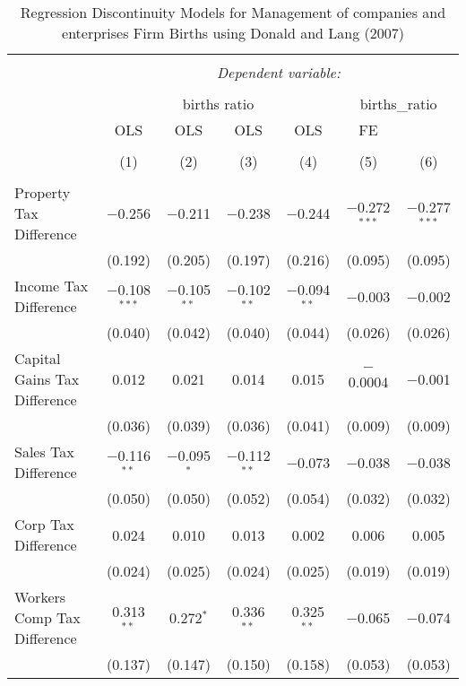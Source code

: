 
\begin{table}[!htbp] \centering 
  \caption{Regression Discontinuity Models for  Management of companies and enterprises Firm Births using Donald and Lang (2007)} 
  \label{} 
\begin{tabular}{@{\extracolsep{5pt}}lcccccc} 
\\[-1.8ex]\hline 
\hline \\[-1.8ex] 
 & \multicolumn{6}{c}{\textit{Dependent variable:}} \\ 
\cline{2-7} 
\\[-1.8ex] & \multicolumn{4}{c}{births ratio} & \multicolumn{2}{c}{births\_ratio} \\ 
 & OLS & OLS & OLS & OLS & FE &  \\ 
\\[-1.8ex] & (1) & (2) & (3) & (4) & (5) & (6)\\ 
\hline \\[-1.8ex] 
 Property Tax Difference & $-$0.256 & $-$0.211 & $-$0.238 & $-$0.244 & $-$0.272$^{***}$ & $-$0.277$^{***}$ \\ 
  & (0.192) & (0.205) & (0.197) & (0.216) & (0.095) & (0.095) \\ 
  Income Tax Difference & $-$0.108$^{***}$ & $-$0.105$^{**}$ & $-$0.102$^{**}$ & $-$0.094$^{**}$ & $-$0.003 & $-$0.002 \\ 
  & (0.040) & (0.042) & (0.040) & (0.044) & (0.026) & (0.026) \\ 
  Capital Gains Tax Difference & 0.012 & 0.021 & 0.014 & 0.015 & $-$0.0004 & $-$0.001 \\ 
  & (0.036) & (0.039) & (0.036) & (0.041) & (0.009) & (0.009) \\ 
  Sales Tax Difference & $-$0.116$^{**}$ & $-$0.095$^{*}$ & $-$0.112$^{**}$ & $-$0.073 & $-$0.038 & $-$0.038 \\ 
  & (0.050) & (0.050) & (0.052) & (0.054) & (0.032) & (0.032) \\ 
  Corp Tax Difference & 0.024 & 0.010 & 0.013 & 0.002 & 0.006 & 0.005 \\ 
  & (0.024) & (0.025) & (0.024) & (0.025) & (0.019) & (0.019) \\ 
  Workers Comp Tax Difference & 0.313$^{**}$ & 0.272$^{*}$ & 0.336$^{**}$ & 0.325$^{**}$ & $-$0.065 & $-$0.074 \\ 
  & (0.137) & (0.147) & (0.150) & (0.158) & (0.053) & (0.053) \\ 

\end{tabular}
\end{table}
